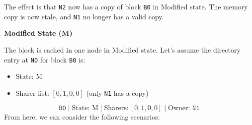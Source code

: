 \begin{itemize}
\begin{figure}[!htp]
    \end{figure}
    The effect is that \texttt{N2} now has a copy of block \texttt{B0} in Modified state. The memory copy is now stale, and \texttt{N1} no longer has a valid copy.
\end{itemize}

\begin{flushleft}
    \textcolor{Green3}{ \textbf{Modified State (M)}}
\end{flushleft}
The block is cached in one node in Modified state. Let's assume the directory entry at \texttt{N0} for block \texttt{B0} is:
\begin{itemize}
    \item State: M
    \item Sharer list: $[0, 1, 0, 0]$ (only \texttt{N1} has a copy)
\end{itemize}
\begin{equation*}
    \texttt{B0} \; | \; \text{State: M} \; | \; \text{Sharers:} \, \left[0, 1, 0, 0\right] \; | \; \text{Owner: } \texttt{N1}
\end{equation*}
From here, we can consider the following scenarios:
